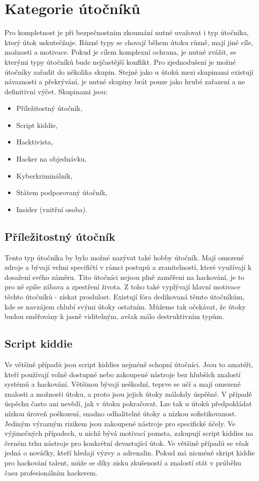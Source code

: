\section{Kategorie útočníků}\label{sec:kategorie-utocniku}
Pro kompletnost je při bezpečnostním zkoumání nutné uvažovat i typ útočníka, který útok uskutečňuje.
Různé typy se chovají během útoku různě, mají jiné cíle, možnosti a motivace.
Pokud je cílem komplexní ochrana, je nutné zvážit, se kterými typy útočníků bude nejčastější konflikt.
Pro zjednodušení je možné útočníky zařadit do několika skupin.
Stejně jako u útoků mezi skupinami existují návaznosti a překrývání, je nutné skupiny brát pouze jako hrubé zařazení a ne definitivní výčet.
Skupinami jsou:
\begin{itemize}
	\item Příležitostný útočník,
	\item Script kiddie,
	\item Hacktivista,
	\item Hacker na objednávku,
	\item Kyberkriminálník,
	\item Státem podporovaný útočník,
	\item Insider (vnitřní osoba).
\end{itemize}\cite{Enisa_thread_landscape,data_flair_attackers}

\subsection{Příležitostný útočník}\label{subsec:prilezitostny-utocnik}
Tento typ útočníka by bylo možné nazývat také hobby útočník.
Mají omezené zdroje a bývají velmi specifičtí v rámci postupů a zranitelností, které využívají k dosažení svého záměru.
Tito útočníci nejsou plně zaměřeni na hackování, je to pro ně spíše zábava a zpestření života.
Z toho také vyplývají hlavní motivace těchto útočníků - získat proslulost.
Existují fóra dedikovaná těmto útočníkům, kde se navzájem chlubí svými útoky ostatním.
Můžeme tak očekávat, že útoky budou směřovány k jasně viditelným, avšak málo destruktivním typům.

\subsection{Script kiddie}\label{subsec:script-kiddie}
Ve většině případů jsou script kiddies nejméně schopní útočníci.
Jsou to amatéři, kteří používají volně dostupné nebo zakoupené nástroje bez hlubších znalostí systémů a hackování.
Většinou bývají neškodní, teprve se učí a mají omezené znalosti a možnosti útoku, a proto jsou jejich útoky málokdy úspěšné.
V případě úspěchu často ani nevědí, jak v útoku pokračovat.
Lze tak u útoků předpokládat nízkou úroveň poškození, snadno odhalitelné útoky a nízkou sofistikovanost.
Jediným výrazným rizikem jsou zakoupené nástroje pro specifické účely.
Ve výjimečných případech, u nichž bývá motivací pomsta, zakupují script kiddies na černém trhu nástroje pro konkrétní devastující útok.
Ve většině případů se však jedná o nováčky, kteří hledají výzvy a adrenalin.
Pokud má nicméně skript kiddie pro hackování talent, může se díky zisku zkušeností a znalostí stát v průběhu času profesionálním hackerem.

